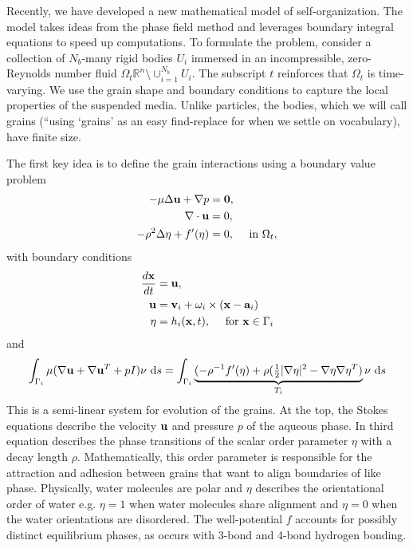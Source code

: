 Recently, we have developed a new mathematical model of self-organization.
The model takes ideas from the phase field method 
and leverages boundary integral equations to speed up computations.
To formulate the problem, consider a collection of $N_b$-many rigid bodies
$U_i$ immersed in an incompressible, zero-Reynolds number fluid
$\Omega_t \mathbb{R}^n \setminus \cup_{i=1}^{N_b} U_i$.
The subscript $t$ reinforces that $\Omega_t$ is time-varying. 
We use the grain shape and boundary conditions to capture the local 
properties of the suspended media.
Unlike particles, the bodies, which we will call grains (``using `grains' as an easy find-replace for
when we settle on vocabulary), have finite size.

The first key idea is
to define the grain interactions using a boundary value problem
\begin{align}
  -\mu\Delta \mathbf{u} + \nabla p &= \mathbf{0},\\
  \nabla \cdot \mathbf{u} &= 0,\\
-\rho^2 \Delta \eta + f'(\eta) &= 0, \quad \text{ in } \Omega_t,
\end{align}
with boundary conditions
\begin{align}
  \frac{d\mathbf{x}}{dt} &= \mathbf{u},\\
  \mathbf{u} &= \mathbf{v}_i + \omega_i \times (\mathbf{x} - \mathbf{a}_i)\\
  \eta &= h_i(\mathbf{x},t),\quad \text{ for } \mathbf{x} \in \Gamma_i
\end{align}
and
\begin{equation}
\int_{\Gamma_i} \mu(\nabla \uu + \nabla \uu^T + pI)\nu \,\dif s = 
\int_{\Gamma_i}
\underbrace{(-\rho^{-1} f'(\eta)
  + \rho(\tfrac{1}{2}|\nabla \eta|^2 - \nabla \eta \nabla \eta^T)}_{T_i} \nu \, \dif s
\end{equation}
This is a semi-linear system for evolution of the grains.  At the top,
the Stokes equations describe the velocity $\mathbf{u}$ and pressure $p$ of the
aqueous phase. In third equation describes the phase transitions of the
scalar order parameter $\eta$ with a decay length $\rho.$
Mathematically, this order parameter is responsible for the attraction
and adhesion between grains that want to align boundaries of like phase.  
Physically, water molecules are polar and $\eta$ describes the orientational
order of water e.g. $\eta = 1$ when water molecules share alignment
and $\eta = 0$ when the water orientations are disordered.
The well-potential $f$ accounts for possibly distinct equilibrium phases,
as occurs with 3-bond and 4-bond hydrogen bonding.

